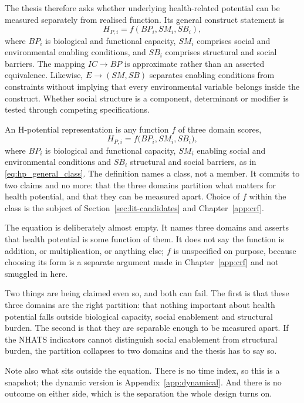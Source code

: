 The thesis therefore asks whether underlying health-related potential can be
measured separately from realised function. Its general construct statement is
\begin{equation}
\boxed{H_{P,i}=f(BP_i,SM_i,SB_i)},
\label{eq:hp_general_class}
\end{equation}
where $BP_i$ is biological and functional capacity, $SM_i$ comprises social and
environmental enabling conditions, and $SB_i$ comprises structural and social
barriers. The mapping $IC\rightarrow BP$ is approximate rather than an asserted
equivalence. Likewise, $E\rightarrow(SM,SB)$ separates enabling conditions from
constraints without implying that every environmental variable belongs inside
the construct. Whether social structure is a component, determinant or modifier
is tested through competing specifications.

\begin{definition}
\label{def:lit-hpclass}
An H-potential representation is any function $f$ of three domain scores,
\[
  H_{P,i}=f\bigl(BP_i,SM_i,SB_i\bigr),
\]
where $BP_i$ is biological and functional capacity, $SM_i$ enabling social and
environmental conditions and $SB_i$ structural and social barriers, as in
\eqref{eq:hp_general_class}. The definition names a class, not a member. It
commits to two claims and no more: that the three domains partition what
matters for health potential, and that they can be measured apart. Choice of
$f$ within the class is the subject of Section~\ref{sec:lit-candidates} and
Chapter~\ref{app:crf}.
\end{definition}

\begin{reading}
The equation is deliberately almost empty. It names three domains and asserts
that health potential is some function of them. It does not say the function is
addition, or multiplication, or anything else; $f$ is unspecified on purpose,
because choosing its form is a separate argument made in
Chapter~\ref{app:crf} and not smuggled in here.

Two things are being claimed even so, and both can fail. The first is that
these three domains are the right partition: that nothing important about
health potential falls outside biological capacity, social enablement and
structural burden. The second is that they are separable enough to be measured
apart. If the NHATS indicators cannot distinguish social enablement from
structural burden, the partition collapses to two domains and the thesis has to
say so.

Note also what sits outside the equation. There is no time index, so this is a
snapshot; the dynamic version is Appendix~\ref{app:dynamical}. And there is no
outcome on either side, which is the separation the whole design turns on.
\end{reading}

